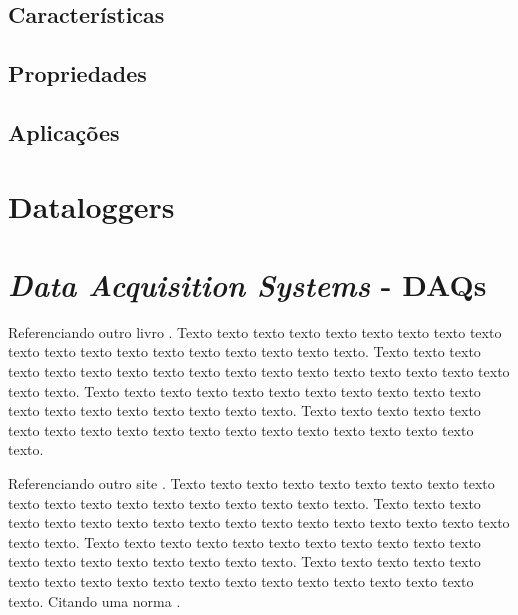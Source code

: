 \subsection{Características}






\subsection{Propriedades}



\subsection{Aplicações}








\section{Dataloggers}\label{sec:datalogger}



\section{\textit{Data Acquisition Systems} - DAQs}


    Referenciando outro livro \cite{LangtangenLogg2017}. Texto texto texto texto texto texto texto texto texto texto texto texto texto texto texto texto texto texto texto. Texto texto texto texto texto texto texto texto texto texto texto texto texto texto texto texto texto texto texto. Texto texto texto texto texto texto texto texto texto texto texto texto texto texto texto texto texto texto texto. Texto texto texto texto texto texto texto texto texto texto texto texto texto texto texto texto texto texto texto.

    Referenciando outro site \cite{secretaria1999}. Texto texto texto texto texto texto texto texto texto texto texto texto texto texto texto texto texto texto texto. Texto texto texto texto texto texto texto texto texto texto texto texto texto texto texto texto texto texto texto. Texto texto texto texto texto texto texto texto texto texto texto texto texto texto texto texto texto texto texto. Texto texto texto texto texto texto texto texto texto texto texto texto texto texto texto texto texto texto texto. Citando uma norma \cite{NBR10520:2002}.
        
